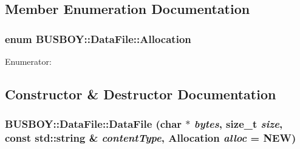 \subsection{Member Enumeration Documentation}
\hypertarget{classBUSBOY_1_1DataFile_aff6de50b1c1e19698f0b4fdf2c62e02b}{
\subsubsection[{Allocation}]{\setlength{\rightskip}{0pt plus 5cm}enum {\bf BUSBOY::DataFile::Allocation}}}
\label{classBUSBOY_1_1DataFile_aff6de50b1c1e19698f0b4fdf2c62e02b}
\begin{Desc}
\item[Enumerator: ]\par
\begin{description}
\item[{\em 
\hypertarget{classBUSBOY_1_1DataFile_aff6de50b1c1e19698f0b4fdf2c62e02baeac067bf27342c26055791a0abd2544d}{
MALLOC}
\label{classBUSBOY_1_1DataFile_aff6de50b1c1e19698f0b4fdf2c62e02baeac067bf27342c26055791a0abd2544d}
}]\item[{\em 
\hypertarget{classBUSBOY_1_1DataFile_aff6de50b1c1e19698f0b4fdf2c62e02ba3f1fd046f6e2b873b0026fc7d01b2dda}{
NEW}
\label{classBUSBOY_1_1DataFile_aff6de50b1c1e19698f0b4fdf2c62e02ba3f1fd046f6e2b873b0026fc7d01b2dda}
}]\end{description}
\end{Desc}



\subsection{Constructor \& Destructor Documentation}
\hypertarget{classBUSBOY_1_1DataFile_a61a6181448c5cafa808e37f62999bcbf}{
\subsubsection[{DataFile}]{\setlength{\rightskip}{0pt plus 5cm}BUSBOY::DataFile::DataFile (char $\ast$ {\em bytes}, \/  size\_\-t {\em size}, \/  const std::string \& {\em contentType}, \/  {\bf Allocation} {\em alloc} = {\ttfamily NEW})}}
\label{classBUSBOY_1_1DataFile_a61a6181448c5cafa808e37f62999bcbf}


